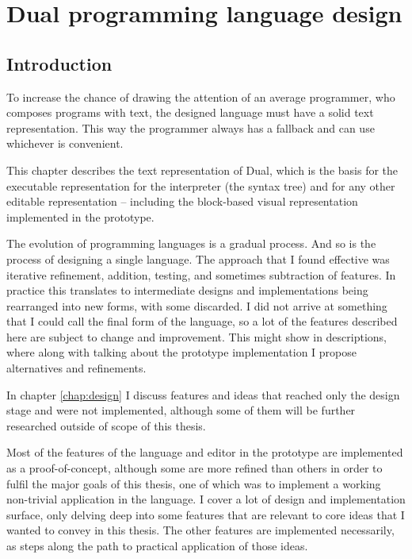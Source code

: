 \chapter{Dual programming language design}\label{chap:lang}

\section{Introduction}
To increase the chance of drawing the attention of an average programmer, who composes programs with text, the designed language must have a solid text representation. This way the programmer always has a fallback and can use whichever is convenient.


This chapter describes the text representation of Dual, which is the basis for the executable representation for the interpreter (the syntax tree) and for
any other editable representation -- including the block-based visual
representation implemented in the prototype.




The evolution of programming languages is a gradual process. And so is the
process of designing a single language. The approach that I found effective was
iterative refinement, addition, testing, and sometimes subtraction of
features. In practice this translates to intermediate designs and
implementations being rearranged into new forms, with some discarded. I did not
arrive at something that I could call the final form of the language, so a lot
of the features described here are subject to change and improvement. This might
show in descriptions, where along with talking about the prototype
implementation I propose alternatives and refinements.

In chapter \ref{chap:design} I discuss features and ideas that reached only the
design stage and were not implemented, although some of them will be further
researched outside of scope of this thesis.

Most of the features of the language and editor in the prototype are implemented
as a proof-of-concept, although some are more refined than others in order to
fulfil the major goals of this thesis, one of which was to implement a working
non-trivial application in the language. I cover a lot of design and
implementation surface, only delving deep into some features that are relevant
to core ideas that I wanted to convey in this thesis. The other features are
implemented necessarily, as steps along the path to practical application of
those ideas.

